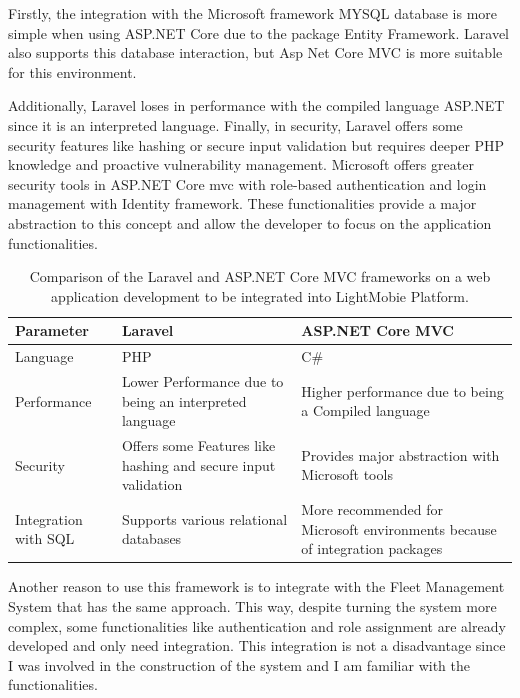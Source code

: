Firstly, the integration with the Microsoft framework MYSQL database is more simple when using ASP.NET Core due to the package Entity Framework. %
Laravel also supports this database interaction, but Asp Net Core MVC is more suitable for this environment. ~\cite{asp_net_vs_laravel}

Additionally, Laravel loses in performance with the compiled language ASP.NET since it is an interpreted language. 
Finally, in security, Laravel offers some security features like hashing or secure input validation but requires deeper PHP knowledge and proactive vulnerability management. 
Microsoft offers greater security tools in ASP.NET Core mvc with role-based authentication and login management with Identity framework.
These functionalities provide a major abstraction to this concept and allow the developer to focus on the application functionalities. ~\cite{asp_net_vs_laravel}


\begin{table}[]
    \begin{tabular}{| m{5em} | m{15em} | m{15em} |}
      \hline
   Parameter & Laravel  & ASP.NET Core MVC   \\
     \hline
   Language & PHP & C\#  \\
     \hline
   Performance & Lower Performance due to being an interpreted language & Higher performance due to being a Compiled language   \\
     \hline
   Security & Offers some Features like hashing and secure input validation & Provides major abstraction with Microsoft tools   \\
     \hline
   Integration with SQL & Supports various relational databases & More recommended for Microsoft environments because of integration packages  \\
     \hline
  \end{tabular}
    \caption{Comparison of the Laravel and ASP.NET Core MVC frameworks on a web application development to be integrated into LightMobie Platform.}
    \label{table:architetcture_comparison}
    \end{table}

  Another reason to use this framework is to integrate with the Fleet Management System that has the same approach. 
  This way, despite turning the system more complex, some functionalities like authentication and role assignment are already developed and only need integration. 
  This integration is not a disadvantage since I was involved in the construction of the system and I am familiar with the functionalities.
  
